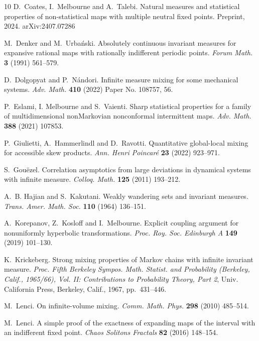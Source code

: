 \documentclass[12pt]{article}
\numberwithin{equation}{section}
\begin{document}
\begin{thebibliography}{10}
D.~Coates, I.~Melbourne and A.~Talebi. Natural measures and statistical
  properties of non-statistical maps with multiple neutral fixed points.
  Preprint, 2024. arXiv:2407.07286

M.~Denker and M.~Urba\'{n}ski. Absolutely continuous invariant measures for
  expansive rational maps with rationally indifferent periodic points.
  \emph{Forum Math.} \textbf{3} (1991) 561--579.

D.~Dolgopyat and P.~N\'andori. Infinite measure mixing for some mechanical
  systems. \emph{Adv. Math.} \textbf{410} (2022) Paper No. 108757, 56.

P.~Eslami, I. Melbourne and S.~Vaienti. Sharp statistical properties for a
  family of multidimensional nonMarkovian nonconformal intermittent maps.
  \emph{Adv. Math.} \textbf{388} (2021) 107853.

P.~Giulietti, A.~Hammerlindl and D.~Ravotti. Quantitative global-local mixing
  for accessible skew products. \emph{Ann. Henri Poincar\'e} \textbf{23}
  (2022) 923--971.

S.~Gou{\"e}zel. Correlation asymptotics from large deviations in dynamical
  systems with infinite measure. \emph{Colloq. Math.} \textbf{125} (2011)
  193--212.

A.~B. Hajian and S.~Kakutani. Weakly wandering sets and invariant measures.
  \emph{Trans. Amer. Math. Soc.} \textbf{110} (1964) 136--151.

A.~Korepanov, Z.~Kosloff and I.~Melbourne. Explicit coupling argument for
  nonuniformly hyperbolic transformations. \emph{Proc. Roy. Soc. Edinburgh A}
  \textbf{149} (2019) 101--130.

K.~Krickeberg. Strong mixing properties of {M}arkov chains with infinite
  invariant measure. \emph{Proc. {F}ifth {B}erkeley {S}ympos. {M}ath.
  {S}tatist. and {P}robability ({B}erkeley, {C}alif., 1965/66), {V}ol. {II}:
  {C}ontributions to {P}robability {T}heory, {P}art 2}, Univ. California Press,
  Berkeley, Calif., 1967, pp.~431--446.

M.~Lenci. On infinite-volume mixing. \emph{Comm. Math. Phys.} \textbf{298}
  (2010) 485--514.

M.~Lenci. A simple proof of the exactness of expanding maps of the interval
  with an indifferent fixed point. \emph{Chaos Solitons Fractals} \textbf{82}
  (2016) 148--154.


\end{thebibliography}
\end{document}
